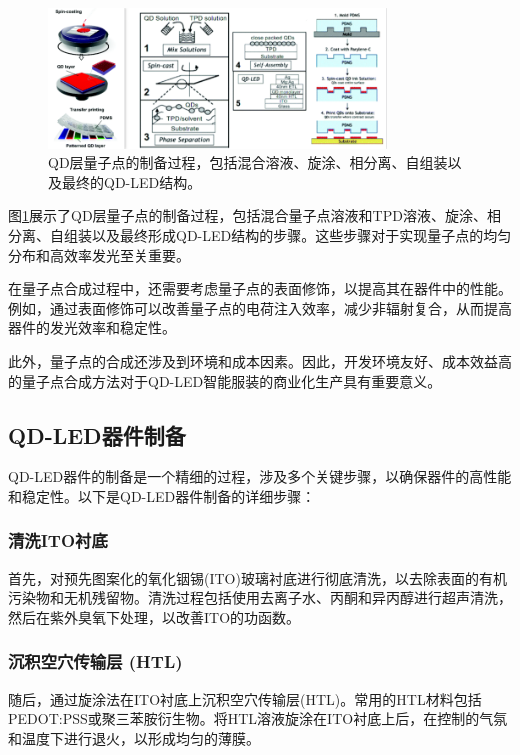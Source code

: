 \documentclass[12pt,hyperref,a4paper,UTF8]{ctexart}
\begin{document}
\begin{figure}[H]
  \centering
  \includegraphics[width=0.8\textwidth]{figures/fig/image12.png} 
  \caption{QD层量子点的制备过程，包括混合溶液、旋涂、相分离、自组装以及最终的QD-LED结构。\cite{bang2021technology}}
  \label{fig:qd_synthesis_process}
\end{figure}

图\ref{fig:qd_synthesis_process}展示了QD层量子点的制备过程，包括混合量子点溶液和TPD溶液、旋涂、相分离、自组装以及最终形成QD-LED结构的步骤。这些步骤对于实现量子点的均匀分布和高效率发光至关重要。

在量子点合成过程中，还需要考虑量子点的表面修饰，以提高其在器件中的性能。例如，通过表面修饰可以改善量子点的电荷注入效率，减少非辐射复合，从而提高器件的发光效率和稳定性。

此外，量子点的合成还涉及到环境和成本因素。因此，开发环境友好、成本效益高的量子点合成方法对于QD-LED智能服装的商业化生产具有重要意义。



\subsection{QD-LED器件制备}
QD-LED器件的制备是一个精细的过程，涉及多个关键步骤，以确保器件的高性能和稳定性。以下是QD-LED器件制备的详细步骤：

\subsubsection*{清洗ITO衬底}
首先，对预先图案化的氧化铟锡(ITO)玻璃衬底进行彻底清洗，以去除表面的有机污染物和无机残留物。清洗过程包括使用去离子水、丙酮和异丙醇进行超声清洗，然后在紫外臭氧下处理，以改善ITO的功函数。

\subsubsection*{沉积空穴传输层 (HTL)}
随后，通过旋涂法在ITO衬底上沉积空穴传输层(HTL)。常用的HTL材料包括PEDOT:PSS或聚三苯胺衍生物。将HTL溶液旋涂在ITO衬底上后，在控制的气氛和温度下进行退火，以形成均匀的薄膜。
\end{document}
